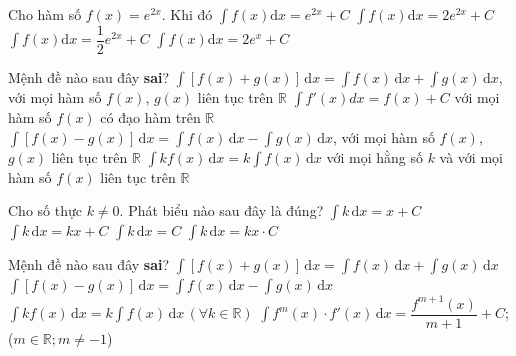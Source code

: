 \begin{ex}%
	 Cho hàm số $f(x) = e^{2x}$. Khi đó
	\choice 
		{$\displaystyle\int f(x)  \mathrm{d}x = e^{2x} + C$}
		{$\displaystyle\int  f(x) \mathrm{d}x = 2e^{2x} + C$}
		 {\True $\displaystyle\int f(x) \mathrm{d}x = \dfrac{1}{2}e^{2x} + C$}
		{$\displaystyle\int f(x) \mathrm{d}x = 2e^x + C$} 
\end{ex}

\begin{ex}%
	Mệnh đề nào sau  đây \textbf{sai}?
	\choice 
		{$\displaystyle\int[f(x)+g(x)]\,\mathrm{d}x=\displaystyle\int f(x)\,\mathrm{d}x+\displaystyle\int g(x)\,\mathrm{d}x$, với  mọi hàm số $f(x)$, $g(x)$ liên tục trên $\mathbb{R}$}
		{$\displaystyle\int f'(x)dx=f(x)+C$ với  mọi hàm số $f(x)$ có đạo hàm trên $\mathbb{R}$}
		{$\displaystyle\int[f(x)-g(x)]\,\mathrm{d}x=\displaystyle\int f(x)\,\mathrm{d}x-\displaystyle\int g(x)\,\mathrm{d}x$, với  mọi hàm số $f(x)$, $g(x)$ liên tục trên $\mathbb{R}$}
		{\True $\displaystyle\int kf(x)\,\mathrm{d}x=k\displaystyle\int f(x)\,\mathrm{d}x$ với mọi hằng số $k$ và với mọi hàm số $f(x)$ liên tục trên $\mathbb{R}$} 
\end{ex}

\begin{ex}%
	Cho số thực $k\ne 0$.  Phát biểu nào sau đây là đúng?
	\choice 
		{$\displaystyle\int k \mathrm{\,d}x =  x+C$}
		 {\True $\displaystyle\int k \mathrm{\,d}x = kx+C$}
		{$\displaystyle\int k \mathrm{\,d}x =  C$}
		{$\displaystyle\int  k \mathrm{\,d}x = kx \cdot C$}
\end{ex}

\begin{ex}%
	Mệnh đề nào sau  đây {\bf sai}?
	\choice 
		{$\displaystyle\int[f(x)+g(x)]\mathrm{\,d}x  = \int f(x)\mathrm{\,d}x+\int g(x)\mathrm{\,d}x$}
		{$\displaystyle\int[f(x)-g(x)]\mathrm{\,d}x = \int  f(x)\mathrm{\,d}x-\int g(x)\mathrm{\,d}x$}
		{\True $\displaystyle\int k f(x)\mathrm{\,d}x = k\int f(x)\mathrm{\,d}x \,(\forall k \in \mathbb{R})$} 
		{$\displaystyle\int f^m(x)\cdot f'(x)\mathrm{\,d}x  = \dfrac{f^{m+1}(x)}{m+1}+C$; ($m \in \mathbb{R}; m \ne -1$)}
\end{ex}

